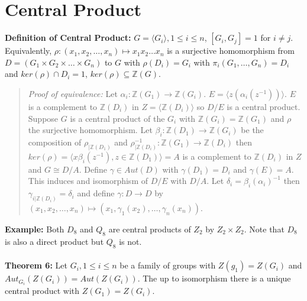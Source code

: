 \section {Central Product}
{\bf Definition of Central Product:} 
$G= \langle G_i \rangle , 1 \le i \le n$, $[G_i , G_j ]=1$ for $i \ne j$.  Equivalently,
$\rho: (x_1, x_2, \ldots , x_n) \mapsto x_1 x_2 \ldots x_n$ is a surjective homomorphism
from $D= (G_1 \times G_2 \times \ldots \times G_n)$ to $G$ with $\rho(D_i) = G_i$ with
$\pi_i (G_1, \ldots , G_n)= D_i$ and $ker(\rho) \cap D_i = 1$, $ker(\rho) \subseteq {\mathbb Z}(G)$.
\begin{quote}
\emph{Proof of equivalence:} 
Let $\alpha_i: {\mathbb Z}(G_1) \rightarrow {\mathbb Z}(G_i)$.
$E= \langle z(\alpha_i(z^{-1})) \rangle $.  $E$ is a complement to ${\mathbb Z}(D_i )$ in
$Z= \langle {\mathbb Z}(D_i) \rangle $ so $D/E$ is a central product.  Suppose $G$ is a
central product of the $G_i$ with ${\mathbb Z}(G_i)={\mathbb Z}(G_1)$ and $\rho$ the surjective
homomorphism.  Let $\beta_i:{\mathbb Z}(D_1) \rightarrow {\mathbb Z}(G_i)$ be the composition of
$\rho_{|{\mathbb Z}(D_1)}$ and 
$\rho_{|{\mathbb Z}(D_i)}^{-1}: {\mathbb Z}(G_1) \rightarrow {\mathbb Z}(D_i)$ then
$ker(\rho)= \langle x \beta_i(z^{-1}), z \in {\mathbb Z}(D_1) \rangle = A$ is a complement
to ${\mathbb Z}(D_i)$ in $Z$ and $G \cong D/A$.  Define $\gamma \in Aut(D)$ with $\gamma(D_1)=D_i$
and $\gamma(E)=A$.  This induces and isomorphism of $D/E$ with $D/A$.  Let 
$\delta_i= \beta_i (\alpha_i)^{-1}$ then $\gamma_{i|{\mathbb Z}(D_i)}= \delta_i$ and
define $\gamma: D \rightarrow D$ by $(x_1, x_2 , \ldots , x_n) \mapsto (x_1, \gamma_1(x_2), \ldots,
\gamma_n(x_n))$.
\end{quote}
{\bf Example:}
Both $D_8$ and
$Q_8$ are central products of $Z_2$ by $Z_2 \times Z_2$.  Note that $D_8$ is also a direct product but $Q_8$
is not.
\\
\\
{\bf Theorem 6:}
Let $G_i, 1 \le i \le n$ be a family of groups with $Z(g_1)=Z(G_i)$ and
$Aut_{G_i}(Z(G_i))=Aut(Z(G_i))$.  The up to isomorphism there is a unique
central product with $Z(G_1)=Z(G_i)$.
